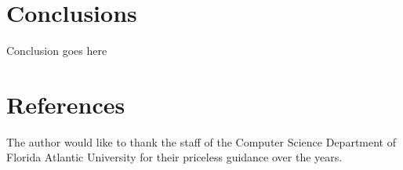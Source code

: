 \section{Conclusions}

Conclusion goes here



\section{References}

\begin{acks}
The author would like to thank the staff of the Computer Science Department
of Florida Atlantic University for their priceless guidance over the years.
\end{acks}



